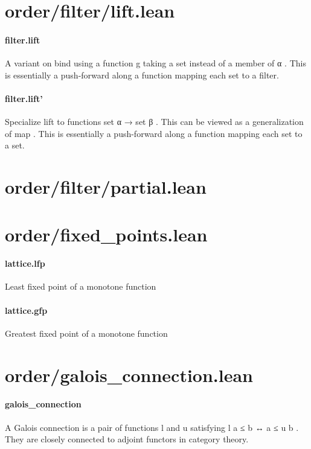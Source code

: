 \documentclass{article}
\begin{document}
\section{order/filter/lift.lean}\paragraph{filter.lift}
\par
A variant on 
\colorbox[RGB]{253,246,227}{{{{\color[RGB]{101, 123, 131} bind }}}} using a function 
\colorbox[RGB]{253,246,227}{{{{\color[RGB]{101, 123, 131} g }}}} taking a set instead of a member of 
\colorbox[RGB]{253,246,227}{{{{\color[RGB]{101, 123, 131} α }}}}.
This is essentially a push-forward along a function mapping each set to a filter.
\paragraph{filter.lift'}
\par
Specialize 
\colorbox[RGB]{253,246,227}{{{{\color[RGB]{101, 123, 131} lift }}}} to functions 
\colorbox[RGB]{253,246,227}{{{{\color[RGB]{101, 123, 131} set α  }}}{{{\color[RGB]{133, 153, 0} → }}}{{{\color[RGB]{101, 123, 131}  set β }}}}. This can be viewed as a generalization of 
\colorbox[RGB]{253,246,227}{{{{\color[RGB]{101, 123, 131} map }}}}.
This is essentially a push-forward along a function mapping each set to a set.
\section{order/filter/partial.lean}\section{order/fixed\_points.lean}\paragraph{lattice.lfp}
\par
Least fixed point of a monotone function
\paragraph{lattice.gfp}
\par
Greatest fixed point of a monotone function
\section{order/galois\_connection.lean}\paragraph{galois\_connection}
\par
A Galois connection is a pair of functions 
\colorbox[RGB]{253,246,227}{{{{\color[RGB]{101, 123, 131} l }}}} and 
\colorbox[RGB]{253,246,227}{{{{\color[RGB]{101, 123, 131} u }}}} satisfying
\colorbox[RGB]{253,246,227}{{{{\color[RGB]{101, 123, 131} l a  }}}{{{\color[RGB]{181, 137, 0} ≤ }}}{{{\color[RGB]{101, 123, 131}  b  }}}{{{\color[RGB]{181, 137, 0} ↔ }}}{{{\color[RGB]{101, 123, 131}  a  }}}{{{\color[RGB]{181, 137, 0} ≤ }}}{{{\color[RGB]{101, 123, 131}  u b }}}}. They are closely connected to adjoint functors
in category theory.
\end{document}

